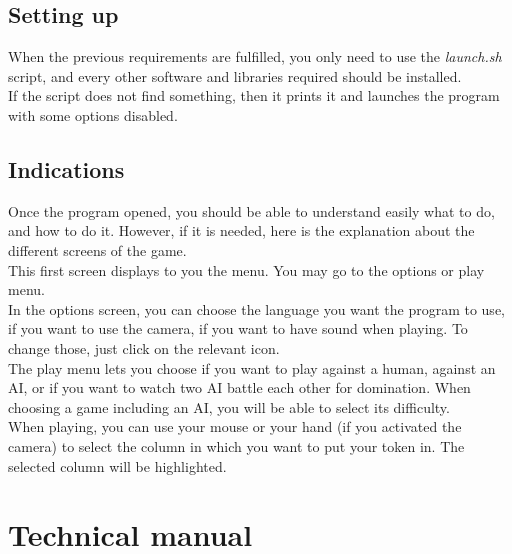 \documentclass[11pt, a4paper, oneside]{report}
\begin{document}
	\section{Setting up}
	When the previous requirements are fulfilled, you only need to use the \textit{launch.sh} script, and every other software and libraries required should be installed. \\
	If the script does not find something, then it prints it and launches the program with some options disabled.

	\section{Indications}
	Once the program opened, you should be able to understand easily what to do, and how to do it. However, if it is needed, here is the explanation about the different screens of the game. \\

	This first screen displays to you the menu. You may go to the options or play menu. \\
	\hspace*{1cm} In the options screen, you can choose the language you want the program to use, if you want to use the camera, if you want to have sound when playing. To change those, just click on the relevant icon. \\
	\hspace*{1cm} The play menu lets you choose if you want to play against a human, against an AI, or if you want to watch two AI battle each other for domination. When choosing a game including an AI, you will be able to select its difficulty. \\

	When playing, you can use your mouse or your hand (if you activated the camera) to select the column in which you want to put your token in. The selected column will be highlighted.

	\chapter{Technical manual}
\end{document}
